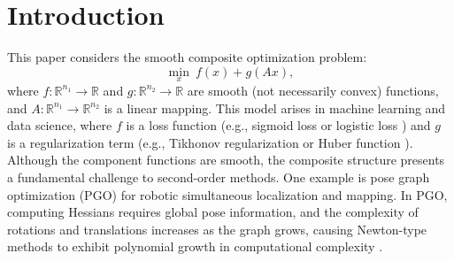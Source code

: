 \documentclass[pdflatex,sn-mathphys-num]{sn-jnl}%
\theoremstyle{thmstyleone}%
\theoremstyle{thmstyletwo}%
\theoremstyle{thmstylethree}%
\begin{document}
\section{Introduction}\label{sec1}
This paper considers the smooth composite optimization problem:
\begin{equation}\label{op}
	\min_{x}~f(x)+g(Ax),
\end{equation}
where $f: \mathbb{R}^{n_1} \to \mathbb{R}$ and $g: \mathbb{R}^{n_2} \to \mathbb{R}$ are smooth (not necessarily convex) functions, and $A: \mathbb{R}^{n_1} \to \mathbb{R}^{n_2}$ is a linear mapping. 
This model arises in machine learning and data science, where $f$ is a loss function (e.g., sigmoid loss \cite{Tibshirani96} or logistic loss \cite{RWL10}) and $g$ is a regularization term (e.g., Tikhonov regularization \cite{tikhonov1977solutions} or Huber function \cite{Huber1964}). 
Although the component functions are smooth, the composite structure presents a fundamental challenge to second-order methods. One example is pose graph optimization (PGO) for robotic simultaneous localization and mapping. In PGO, computing Hessians requires global pose information, and the complexity of rotations and translations increases as the graph grows, causing Newton-type methods to exhibit polynomial growth in computational complexity \cite{hu2018adaptive,chen2025non,chen2026parallelizable}. 
	
\end{document}
